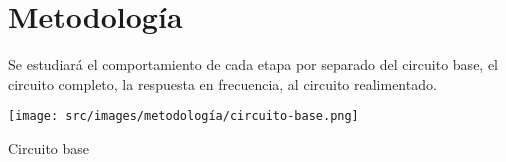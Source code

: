 \section{Metodología}

Se estudiará el comportamiento de cada etapa por separado del circuito base, el circuito completo, la respuesta en frecuencia, al circuito realimentado.

\begin{ilustracion}[ht]
    \centering
    \texttt{[image: src/images/metodología/circuito-base.png]}
    \caption{Circuito base}
    \label{ilus:met-circuito-base}
\end{ilustracion}
    

\FloatBarrier

\FloatBarrier

\FloatBarrier

\FloatBarrier

\FloatBarrier